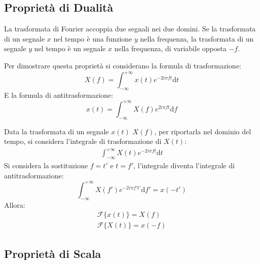 \documentclass{article}
\newcommand{\df}{\mathrm{d}}
\numberwithin{equation}{subsection}
\begin{document}
\subsection{Proprietà di Dualità}

La trasformata di Fourier accoppia due segnali nei due domini. Se la trasformata di un segnale $x$ nel tempo è una funzione $y$ nella frequenza, la trasformata di un segnale $y$ 
nel tempo è un segnale $x$ nella frequenza, di variabile opposta $-f$.

Per dimostrare questa proprietà si considerano la formula di trasformazione:
\begin{equation*}
    X(f)=\displaystyle\int_{-\infty}^{+\infty}x(t)e^{-2i\pi ft}\df t
\end{equation*}
E la formula di antitrasformazione:
\begin{equation*}
    x(t)=\displaystyle\int_{-\infty}^{+\infty}X(f)e^{2i\pi ft}\df f
\end{equation*}

Data la trasformata di un segnale $x(t)$ $X(f)$, per riportarla nel dominio del tempo, si considera l'integrale di trasformazione di $X(t)$:
\begin{gather*}
    \displaystyle\int_{-\infty}^{+\infty}X(t)e^{-2i\pi ft}\df t
\end{gather*}
Si considera la sostituzione $f=t'$ e $t=f'$, l'integrale diventa l'integrale di antitrasformazione:
\begin{equation*}
    \displaystyle\int_{-\infty}^{+\infty}X(f')e^{-2i\pi f't'}\df f'=x(-t')
\end{equation*}
Allora:
\begin{gather*}
    \mathscr{F}\{x(t)\}= X(f)\\
    \mathscr{F}\{X(t)\}=x(-f)
\end{gather*}

\subsection{Proprietà di Scala}
\end{document}

